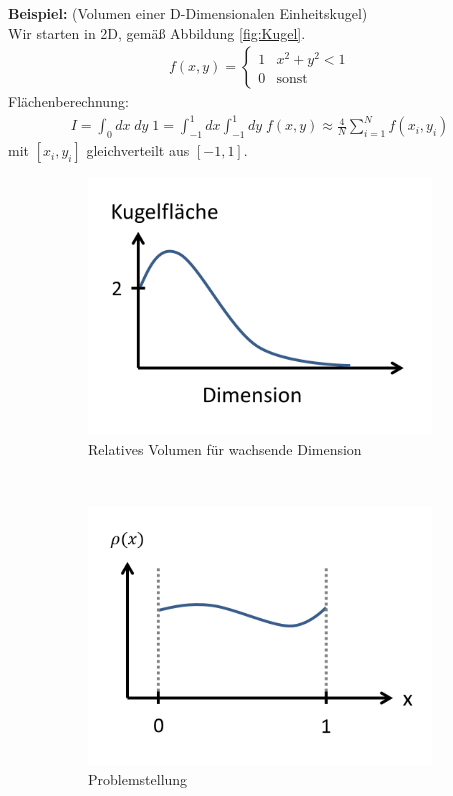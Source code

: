 \documentclass[12pt]{article}
\begin{document}
\textbf{Beispiel:} (Volumen einer D-Dimensionalen Einheitskugel) \\
Wir starten in 2D, gemäß Abbildung \ref{fig:Kugel}.
\begin{align*}
f(x,y)=
\begin{cases}
1 & x^2+y^2 <1 \\
0 & \mbox{sonst}
\end{cases}
\end{align*}
Flächenberechnung: 
\begin{align*}
I= \int_0 dx \; dy \; 1 = \int_{-1}^1 dx \int_{-1}^1 dy \; f(x,y) 
\approx \frac{4}{N} \sum_{i=1}^N f(x_i,y_i)
\end{align*}
mit $[x_i, y_i]$ gleichverteilt aus $[-1,1]$.

\begin{figure}[h] 
		\begin{subfigure}[h]{0.5 \textwidth}
		\centering
		\includegraphics[width=\textwidth]{Folie19.png}
		\caption{Relatives Volumen für wachsende Dimension} 
		\label{fig:RelativesVolumen}
		\centering
	\end{subfigure}
	~
\begin{subfigure}[h]{0.5\textwidth}
		\centering
		\includegraphics[width=\textwidth]{Folie22.png}
		\caption{Problemstellung}
		\label{fig:Problemstellung}
		\centering
	\end{subfigure}
	\caption{ }
\end{figure}	
	
\end{document}
